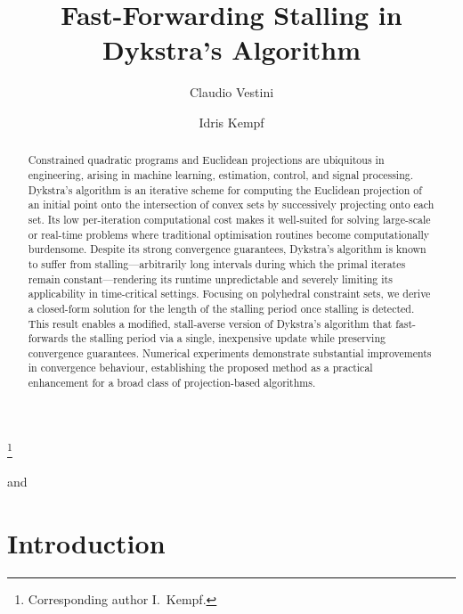 \documentclass[onecolumn]{autart}
\begin{document}
\begin{frontmatter}
\title{Fast-Forwarding Stalling in Dykstra's Algorithm}
\thanks[footnoteinfo]{Corresponding author I.~Kempf.}
\author[oxf]{Claudio Vestini}
and
\author[oxf]{Idris Kempf}
\address[oxf]{Department of Engineering Science, University of Oxford, Parks Road, Oxford, OX1 3PJ, UK}


\begin{abstract}
Constrained quadratic programs and Euclidean projections are ubiquitous in engineering, arising in machine learning, estimation, control, and signal processing. Dykstra's algorithm is an iterative scheme for computing the Euclidean projection of an initial point onto the intersection of convex sets by successively projecting onto each set. Its low per-iteration computational cost makes it well-suited for solving large-scale or real-time problems where traditional optimisation routines become computationally burdensome. Despite its strong convergence guarantees, Dykstra's algorithm is known to suffer from stalling---arbitrarily long intervals during which the primal iterates remain constant---rendering its runtime unpredictable and severely limiting its applicability in time-critical settings. Focusing on polyhedral constraint sets, we derive a closed-form solution for the length of the stalling period once stalling is detected. This result enables a modified, stall-averse version of Dykstra's algorithm that fast-forwards the stalling period via a single, inexpensive update while preserving convergence guarantees. Numerical experiments demonstrate substantial improvements in convergence behaviour, establishing the proposed method as a practical enhancement for a broad class of projection-based algorithms.
\end{abstract}

\end{frontmatter}


\section{Introduction}
\end{document}
